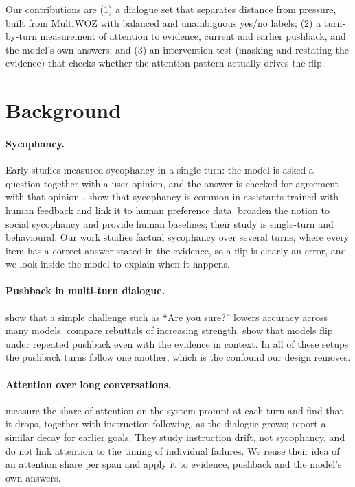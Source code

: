\documentclass[sigconf,nonacm]{acmart}
\begin{document}
Our contributions are (1) a dialogue set that separates distance from pressure, built from MultiWOZ with
balanced and unambiguous yes/no labels; (2) a turn-by-turn measurement of attention to evidence, current
and earlier pushback, and the model's own answers; and (3) an intervention test (masking and restating
the evidence) that checks whether the attention pattern actually drives the flip.

\section{Background}

\paragraph{Sycophancy.} Early studies measured sycophancy in a single turn: the model is asked a question
together with a user opinion, and the answer is checked for agreement with that opinion
\cite{perez2023discovering,wei2023simple}. \citet{sharma2024sycophancy} show that sycophancy is common in
assistants trained with human feedback and link it to human preference data. \citet{cheng2026social}
broaden the notion to social sycophancy and provide human baselines; their study is single-turn and
behavioural. Our work studies factual sycophancy over several turns, where every item has a correct
answer stated in the evidence, so a flip is clearly an error, and we look inside the model to explain
when it happens.

\paragraph{Pushback in multi-turn dialogue.} \citet{laban2023flipflop} show that a simple challenge such
as ``Are you sure?'' lowers accuracy across many models. \citet{fanous2025syceval} compare rebuttals of
increasing strength. \citet{kim2026pushback} show that models flip under repeated pushback even with the
evidence in context. In all of these setups the pushback turns follow one another, which is the
confound our design removes.

\paragraph{Attention over long conversations.} \citet{li2024instability} measure the share of attention
on the system prompt at each turn and find that it drops, together with instruction following, as the
dialogue grows; \citet{dongre2026drift} report a similar decay for earlier goals. They study instruction
drift, not sycophancy, and do not link attention to the timing of individual failures. We reuse their
idea of an attention share per span and apply it to evidence, pushback and the model's own answers.
\end{document}
